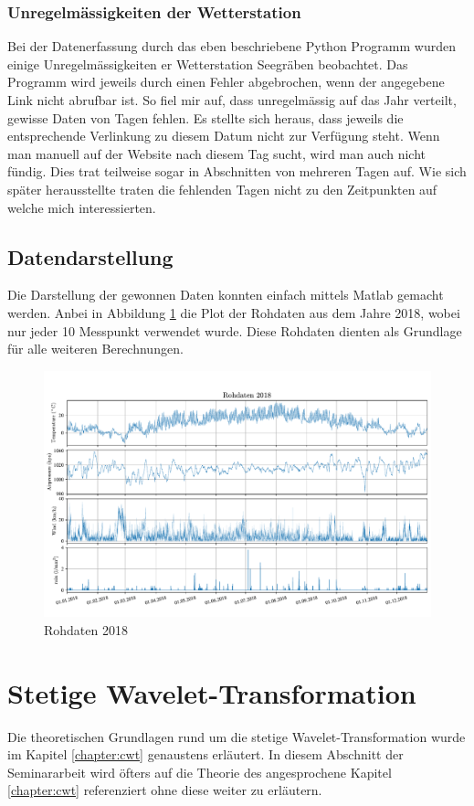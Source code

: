 \begin{refsection}
\subsubsection{Unregelmässigkeiten der Wetterstation}
Bei der Datenerfassung durch das eben beschriebene Python Programm wurden einige Unregelmässigkeiten er Wetterstation Seegräben beobachtet.
Das Programm wird jeweils durch einen Fehler abgebrochen, wenn der angegebene Link nicht abrufbar ist. 
So fiel mir auf, dass unregelmässig auf das Jahr verteilt, gewisse Daten von Tagen fehlen. Es stellte sich heraus, dass jeweils die entsprechende Verlinkung zu diesem Datum nicht zur Verfügung steht.
Wenn man manuell auf der Website nach diesem Tag sucht, wird man auch nicht fündig.
Dies trat teilweise sogar in Abschnitten von mehreren Tagen auf.
Wie sich später herausstellte traten die fehlenden Tagen nicht zu den Zeitpunkten auf welche mich interessierten.


\subsection{Datendarstellung}
Die Darstellung der gewonnen Daten konnten einfach mittels Matlab gemacht werden.
Anbei in Abbildung \ref{fig:rawdata} \space die Plot der Rohdaten aus dem Jahre 2018, wobei nur jeder 10 Messpunkt verwendet wurde.
Diese Rohdaten dienten als Grundlage für alle weiteren Berechnungen. 
\begin{figure}
	\centering
	\includegraphics[width=1\textwidth]{papers/wwt/images/raw.pdf}
	\caption{Rohdaten 2018}
	\label{fig:rawdata}
\end{figure}

\newpage
\section{Stetige Wavelet-Transformation}
Die theoretischen Grundlagen rund um die stetige Wavelet-Transformation wurde im Kapitel \ref{chapter:cwt} genaustens erläutert. 
In diesem Abschnitt der Seminararbeit wird öfters auf die Theorie des angesprochene Kapitel \ref{chapter:cwt} referenziert ohne diese weiter zu erläutern. 


\end{refsection}
